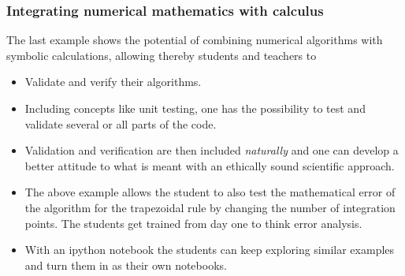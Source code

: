 \documentclass{beamer}
\begin{document}
\begin{frame}
\frametitle{Integrating numerical mathematics with calculus}

\begin{block}{}
The last example shows the potential of combining numerical algorithms with symbolic calculations, allowing thereby students and teachers to

\begin{itemize}
\item Validate and verify  their  algorithms. 

\item Including concepts like unit testing, one has the possibility to test and validate several or all parts of the code.

\item Validation and verification are then included \emph{naturally} and one can develop a better attitude to what is meant with an ethically sound scientific approach.

\item The above example allows the student to also test the mathematical error of the algorithm for the trapezoidal rule by changing the number of integration points. The students get trained from day one to think error analysis. 

\item With an ipython notebook the students can keep exploring similar examples and turn them in as their own notebooks. 
\end{itemize}

\noindent
\end{block}
\end{frame}
\end{document}
